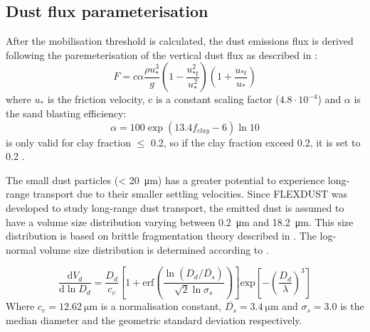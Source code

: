 \subsection{Dust flux parameterisation}

After the mobilisation threshold is calculated,  the dust emissions flux is derived following the paremeterisation of the vertical dust flux as described in \textcite{MB95_dust_emission}: 
\begin{equation}
    F=c\alpha \frac{\rho u_{*}^3}{g}\left(1-\frac{u^2_{*t}}{u^2_*}\right)\left(1+ \frac{u_{*t}}{u_*}\right)
\end{equation}
where $u_*$ is the friction velocity, c is a constant scaling factor ($4.8\cdot 10^{-4}$) and $\alpha$ is the sand blasting efficiency:
\begin{equation}\label{eq:sand_blasing_eff}
    \alpha = 100\exp{(13.4f_{clay}-6)\ln 10}
\end{equation}
 is only valid for clay fraction $\leq$ 0.2, so if the clay fraction exceed 0.2, it is set to 0.2 \parencite{zender2003mineral}. 


The small dust particles (< \SI{20}{\micro\metre}) has a greater potential to experience long-range transport due to their smaller settling velocities. Since FLEXDUST was developed to study long-range dust transport, the emitted dust is assumed to have a volume size distribution varying between \SI{0.2}{\micro\metre} and \SI{18.2}{\micro\metre}. This size distribution is based on brittle fragmentation theory described in \textcite{kok_scaling_2011}. The log-normal volume size distribution is determined according to . 

\begin{equation}\label{eq:size_dist}
    \frac{\text{d} V_d}{\text{d} \ln D_d} = \frac{D_d}{c_v}\left[1 + \text{erf}\left(\frac{\ln(D_d/\overline{D_s})}{\sqrt{2}\ln \sigma_s}\right)\right]\text{exp}\left[-\left(\frac{D_d}{\lambda}\right)^3\right]
\end{equation}
Where $c_v = \SI{12.62}{\micro\metre}$ is a normalisation constant, $\overline{D_s}=\SI{3.4}{\micro\metre}$ and $\sigma_s = 3.0$ is the median diameter and the geometric standard deviation respectively.  

